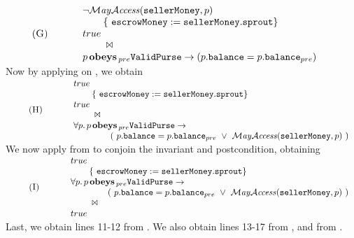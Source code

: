 $\HoareNLSP {G} 
      {\neg \MayAccess(\sM,p)}  
     {\eM:=\sM.\sprout} 
     {\true} 
     {p\obeys\pre \PS \rightarrow (p.\bal=p.\bal\pre) }
$ \\
Now by applying  on , we obtain\\
$\HoareNLSP {H} 
      { \true}  
     {\eM:=\sM.\sprout} 
     {\true} 
     {\forall p. \, p\obeys\pre \PS \rightarrow \\
      \SP\SP\SP\SP (\ p.\bal=p.\bal\pre  \ \vee\  \MayAccess(\sM,p) \ ) }
$
\\
We now apply  from \cite{appendix} to conjoin the invariant and postcondition, obtaining\\
$\HoareNLSP {I} 
      { \true}  
     {\eM:=\sM.\sprout} 
          {\forall p. \, p\obeys\pre \PS \rightarrow \\
      \SP\SP\SP\SP (\ p.\bal=p.\bal\pre  \ \vee\  \MayAccess(\sM,p) \ ) }
      {\true} $
Last, we obtain lines 11-12 from . We also obtain lines 13-17 from , and    from \cite{appendix}.

